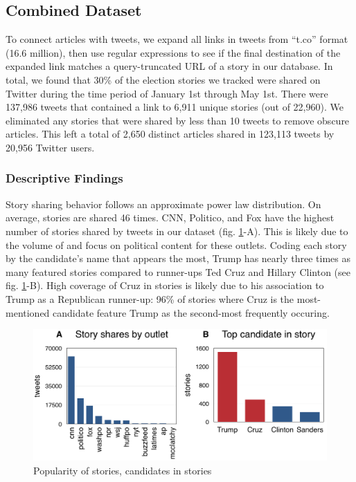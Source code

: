 \documentclass[letterpaper]{article}
\begin{document}
\subsection{Combined Dataset}
To connect articles with tweets, we expand all links in tweets from ``t.co'' format (16.6 million), then use regular expressions to see if the final destination of the expanded link matches a query-truncated URL of a story in our database. In total, we found that 30\% of the election stories we tracked were shared on Twitter during the time period of January 1st through May 1st. There were 137,986 tweets that contained a link to 6,911 unique stories (out of 22,960). We eliminated any stories that were shared by less than 10 tweets to remove obscure articles. This left a total of 2,650 distinct articles shared in 123,113 tweets by 20,956 Twitter users.

\subsubsection{Descriptive Findings}
Story sharing behavior follows an approximate power law distribution. On average, stories are shared 46 times. CNN, Politico, and Fox have the highest number of stories shared by tweets in our dataset (fig. \ref{fig:story-stats}-A). This is likely due to the volume of and focus on political content for these outlets. Coding each story by the candidate's name that appears the most, Trump has nearly three times as many featured stories compared to runner-ups Ted Cruz and Hillary Clinton (see fig. \ref{fig:story-stats}-B). High coverage of Cruz in stories is likely due to his association to Trump as a Republican runner-up: 96\% of stories where Cruz is the most-mentioned candidate feature Trump as the second-most frequently occuring.

\begin{figure}[t!]
\centering 
  \includegraphics[width=\linewidth]{story-stats}   
    \caption{Popularity of stories, candidates in stories
    \label{fig:story-stats}}
\end{figure}  
\end{document}
